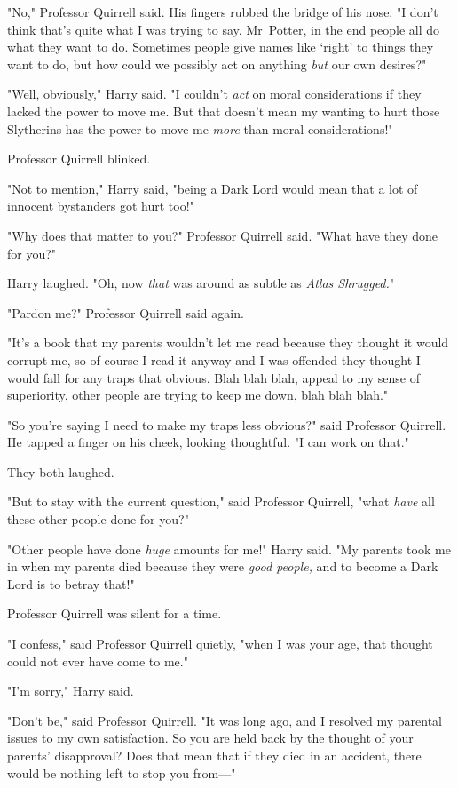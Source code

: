 "No," Professor Quirrell said. His fingers rubbed the bridge of his nose. "I
don't think that's quite what I was trying to say. Mr~Potter, in the end
people all do what they want to do. Sometimes people give names like `right' to
things they want to do, but how could we possibly act on anything \emph{but}
our own desires?"

"Well, obviously," Harry said. "I couldn't \emph{act} on moral considerations
if they lacked the power to move me. But that doesn't mean my wanting to hurt
those Slytherins has the power to move me \emph{more} than moral
considerations!"

Professor Quirrell blinked.

"Not to mention," Harry said, "being a Dark Lord would mean that a lot of
innocent bystanders got hurt too!"

"Why does that matter to you?" Professor Quirrell said. "What have they done
for you?"

Harry laughed. "Oh, now \emph{that} was around as subtle as \emph{Atlas
Shrugged.}"

"Pardon me?" Professor Quirrell said again.

"It's a book that my parents wouldn't let me read because they thought it would
corrupt me, so of course I read it anyway and I was offended they thought I
would fall for any traps that obvious. Blah blah blah, appeal to my sense of
superiority, other people are trying to keep me down, blah blah blah."

"So you're saying I need to make my traps less obvious?" said Professor
Quirrell. He tapped a finger on his cheek, looking thoughtful. "I can work on
that."

They both laughed.

"But to stay with the current question," said Professor Quirrell, "what
\emph{have} all these other people done for you?"

"Other people have done \emph{huge} amounts for me!" Harry said. "My parents
took me in when my parents died because they were \emph{good people,} and to
become a Dark Lord is to betray that!"

Professor Quirrell was silent for a time.

"I confess," said Professor Quirrell quietly, "when I was your age, that
thought could not ever have come to me."

"I'm sorry," Harry said.

"Don't be," said Professor Quirrell. "It was long ago, and I resolved my
parental issues to my own satisfaction. So you are held back by the thought of
your parents' disapproval? Does that mean that if they died in an accident,
there would be nothing left to stop you from—"

